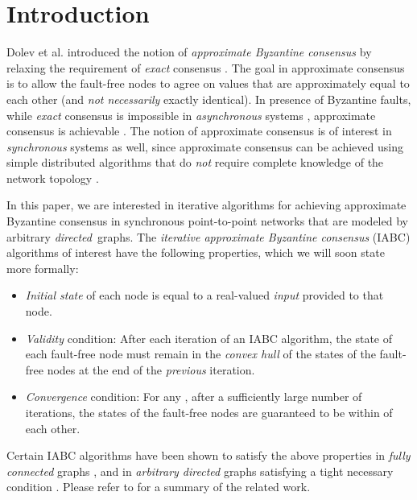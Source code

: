 \documentclass[letterpaper, 12pt]{article}
\begin{document}
 
\section{Introduction}
\label{sec:intro}

Dolev et al. \cite{AA_Dolev_1986} introduced the notion of
{\em approximate Byzantine consensus} by relaxing the requirement
of {\em exact} consensus \cite{AA_nancy}.
The goal in approximate consensus is to allow the fault-free nodes to agree on values that are approximately equal to each other (and {\em not necessarily}
exactly identical). 
In presence of Byzantine faults, while {\em exact} consensus 
is impossible in {\em asynchronous} systems \cite{FLP_one_crash}, approximate
consensus is achievable \cite{AA_Dolev_1986}.
The notion of approximate consensus is of interest in {\em synchronous}
systems as well, since approximate consensus can be achieved using
simple distributed algorithms that do {\em not} require complete knowledge of
the network topology \cite{AA_convergence_markov}.



In this paper, we are interested in iterative algorithms
for achieving approximate Byzantine consensus in synchronous point-to-point
networks that are modeled by arbitrary {\em directed}\, graphs.
The {\em iterative
approximate Byzantine consensus} (IABC) algorithms of interest have
the following properties, which we will soon state more formally:
\begin{itemize}
\item {\em Initial state} of each node is equal to a real-valued
{\em input} provided to that node.
\item {\em Validity} condition: After each iteration of an IABC algorithm, the state of each fault-free node
must remain in the {\em convex hull} of the states of the fault-free nodes
at the end of the {\em previous} iteration.
\item {\em Convergence} condition:
For any , after a sufficiently large number of iterations,
the states of the fault-free nodes are guaranteed to be within 
of each other.
\end{itemize}
Certain IABC algorithms have been shown to satisfy the above properties
in {\em fully
connected} graphs \cite{AA_Dolev_1986,AA_nancy}, and in {\em arbitrary
directed} graphs satisfying a tight necessary condition 
\cite{IBA_sync,us}.
Please refer to \cite{IBA_sync,us} for a summary of the related work.
\end{document}
